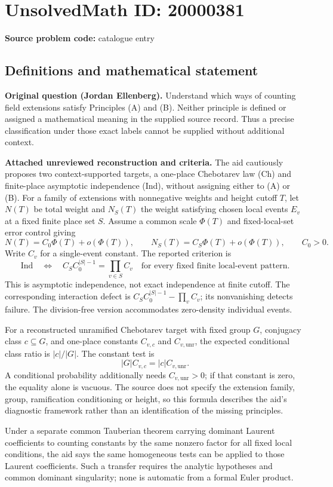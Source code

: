 \documentclass[11pt]{article}
\begin{document}
\section*{UnsolvedMath ID: 20000381}
\textbf{Source problem code:} catalogue entry
\subsection{Definitions and mathematical statement}
\textbf{Original question (Jordan Ellenberg).} Understand which ways of counting field extensions satisfy Principles (A) and (B). Neither principle is defined or assigned a mathematical meaning in the supplied source record. Thus a precise classification under those exact labels cannot be supplied without additional context.

\textbf{Attached unreviewed reconstruction and criteria.} The aid cautiously proposes two context-supported targets, a one-place Chebotarev law (Ch) and finite-place asymptotic independence (Ind), without assigning either to (A) or (B). For a family of extensions with nonnegative weights and height cutoff $T$, let $N(T)$ be total weight and $N_S(T)$ the weight satisfying chosen local events $E_v$ at a fixed finite place set $S$. Assume a common scale $\Phi(T)$ and fixed-local-set error control giving
\[N(T)=C_0\Phi(T)+o(\Phi(T)),\qquad N_S(T)=C_S\Phi(T)+o(\Phi(T)),\qquad C_0>0.\]
Write $C_v$ for a single-event constant. The reported criterion is
\[\mathrm{Ind}\quad\Longleftrightarrow\quad C_SC_0^{|S|-1}=\prod_{v\in S}C_v\quad\text{for every fixed finite local-event pattern}.\]
This is asymptotic independence, not exact independence at finite cutoff. The corresponding interaction defect is $C_SC_0^{|S|-1}-\prod_vC_v$; its nonvanishing detects failure. The division-free version accommodates zero-density individual events.

For a reconstructed unramified Chebotarev target with fixed group $G$, conjugacy class $c\subseteq G$, and one-place constants $C_{v,c}$ and $C_{v,\mathrm{unr}}$, the expected conditional class ratio is $|c|/|G|$. The constant test is
\[|G|C_{v,c}=|c|C_{v,\mathrm{unr}}.\]
A conditional probability additionally needs $C_{v,\mathrm{unr}}>0$; if that constant is zero, the equality alone is vacuous. The source does not specify the extension family, group, ramification conditioning or height, so this formula describes the aid's diagnostic framework rather than an identification of the missing principles.

Under a separate common Tauberian theorem carrying dominant Laurent coefficients to counting constants by the same nonzero factor for all fixed local conditions, the aid says the same homogeneous tests can be applied to those Laurent coefficients. Such a transfer requires the analytic hypotheses and common dominant singularity; none is automatic from a formal Euler product.
\end{document}
